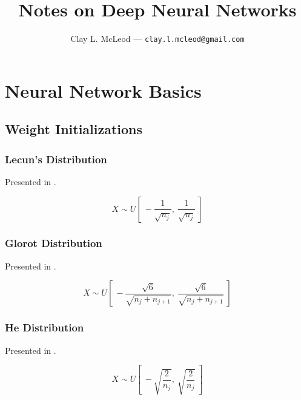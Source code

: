 \documentclass[12pt]{article}
\title{Notes on Deep Neural Networks}
\author{Clay L. McLeod --- \texttt{clay.l.mcleod@gmail.com}}
\begin{document}
\maketitle

\section{Neural Network Basics}
\subsection{Weight Initializations}

\subsubsection{Lecun's Distribution}

Presented in \cite[Sec 4.6]{efficient-backprop}.

\begin{equation}
    X \sim U \left[~-\frac{1}{\sqrt{n_{j}}},~\frac{1}{\sqrt{n_{j}}}~\right]
    \label{eq:lecun}
\end{equation}


\subsubsection{Glorot Distribution}

Presented in \cite[4.2]{glorot10}.

\begin{equation}
    X \sim U \left[~-\frac{\sqrt{6}}{\sqrt{n_{j} + n_{j+1}}},~\frac{\sqrt{6}}{\sqrt{n_{j} + n_{j+1}}}~\right]
    \label{eq:glorot}
\end{equation}

\subsubsection{He Distribution}

Presented in \cite[pg. 4]{he15}.

\begin{equation}
    X \sim U \left[~-\sqrt{\frac{2}{n_{j}}},~\sqrt{\frac{2}{n_{j}}}~\right]
    \label{eq:he}
\end{equation}



\end{document}
